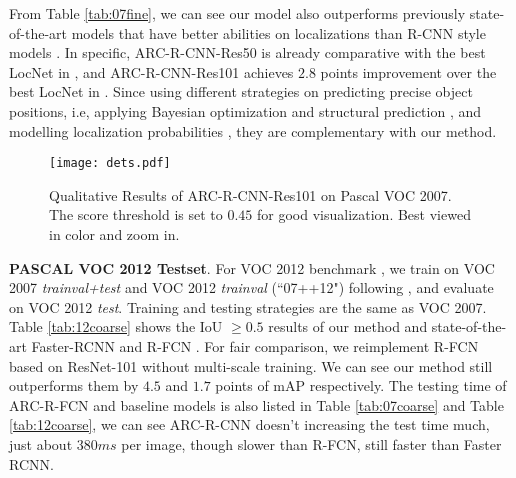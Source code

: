 \documentclass[10pt,twocolumn,letterpaper]{article}
\begin{document}
From Table \ref{tab:07fine}, we can see our model also outperforms previously state-of-the-art models that have better abilities on localizations than R-CNN style models \cite{rcnn,fast_rcnn,faster_rcnn}. In specific, ARC-R-CNN-Res50 is already comparative with the best LocNet in \cite{locNet}, and ARC-R-CNN-Res101 achieves $2.8$ points improvement over the best LocNet in \cite{locNet}.
Since \cite{yuting, locNet} using different strategies on predicting precise object positions, i.e, applying Bayesian optimization and structural prediction \cite{yuting}, and modelling localization probabilities \cite{locNet}, they are complementary with our method. 



\begin{figure*}
\centering
{\texttt{[image: dets.pdf]}}
\caption{Qualitative Results of ARC-R-CNN-Res101 on Pascal VOC 2007. The score threshold is set to $0.45$ for good visualization. Best viewed in color and zoom in. \vspace{-4mm} }
\label{fig:dets}
\vspace{-1mm}
\end{figure*} 

\textbf{PASCAL VOC 2012 Testset}.
For VOC 2012 benchmark \cite{pascal}, we train on VOC 2007 \textit{trainval+test} and VOC 2012 \textit{trainval} (``07++12") following \cite{faster_rcnn,rfcn}, and evaluate on VOC 2012 \textit{test}. 
Training and testing strategies are the same as VOC 2007.
Table \ref{tab:12coarse} shows the IoU $\ge 0.5$ results of our method and state-of-the-art Faster-RCNN \cite{faster_rcnn,resNet} and R-FCN \cite{rfcn}.
For fair comparison, we reimplement R-FCN based on ResNet-101 without multi-scale training. 
We can see our method still outperforms them by $4.5$ and $1.7$ points of mAP respectively. 
The testing time of ARC-R-FCN and baseline models is also listed in Table \ref{tab:07coarse} and Table \ref{tab:12coarse}, we can see ARC-R-CNN doesn't increasing the test time much, just about $380ms$ per image, though slower than R-FCN, still faster than Faster RCNN.
\end{document}
